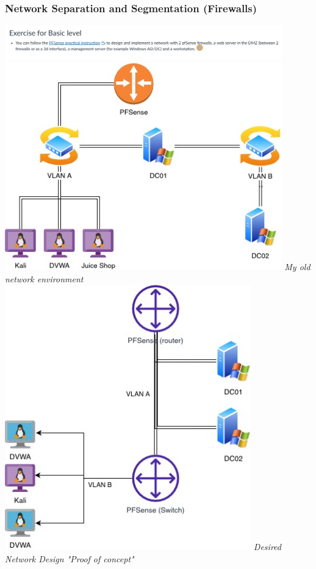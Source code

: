 \documentclass[12pt, letterpaper]{article}
\begin{document}
\subsubsection{Network Separation and Segmentation (Firewalls)}
\includegraphics[width=0.9\textwidth]{fotos/Week 6/Network separation and segmention/Basic level.jpeg}
\hfill\break
\hfill\break
\includegraphics[width=0.9\textwidth]{fotos/Week 5/Semester 4 Week 5 netwerk tekening.jpg}
\break
\emph{My old network environment}
\hfill\break
\hfill\break
\includegraphics[width=0.8\textwidth]{fotos/Week 6/Network separation and segmention/Week 6 network segmentation 2.jpg}
\break
\emph{Desired Network Design "Proof of concept"}
\newpage
\end{document}
